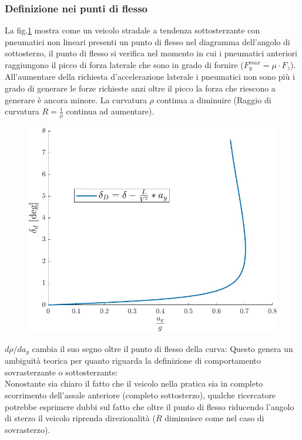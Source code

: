 \subsubsection{Definizione nei punti di flesso}
La fig.\ref{fig:Sterzo Dinamico} mostra come un veicolo stradale a tendenza sottosterzante con pneumatici non lineari 
presenti un punto di flesso nel diagramma dell'angolo di sottosterzo, il punto di flesso si verifica nel momento in cui i 
pneumatici anteriori raggiungono il picco di forza laterale che sono in grado di fornire ($F_y^{max} = \mu \cdot F_z$).
All'aumentare della richiesta d'accelerazione laterale i pneumatici non sono più i grado di generare le forze richieste
anzi oltre il picco la forza che riescono a generare è ancora minore.
La curvatura $\rho$ continua a diminuire (Raggio di curvatura $R = \frac{1}{\rho}$ continua ad aumentare).\\
\begin{figure}[!h]
    \centering
    \includegraphics[scale=0.4]{Immagini/Understeer Gradient/Sterzo dinamico cinesi.jpg}
    \caption{}
    \label{fig:Sterzo Dinamico}
\end{figure}
$d\rho/da_y$ cambia il suo segno oltre il punto di flesso della curva:
Questo genera un ambiguità teorica per quanto riguarda la definizione di comportamento sovrasterzante o sottosterzante:\\
Nonostante sia chiaro il fatto che il veicolo nella pratica sia in completo scorrimento dell'assale anteriore
(completo sottosterzo), qualche ricercatore potrebbe esprimere dubbi sul fatto che oltre il punto di flesso riducendo
l'angolo di sterzo il veicolo riprenda direzionalità ($R$ diminuisce come nel caso di sovrasterzo).

